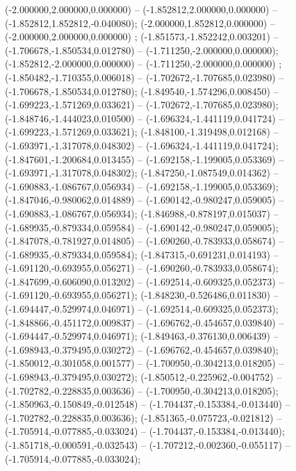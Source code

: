  (-2.000000,2.000000,0.000000) -- (-1.852812,2.000000,0.000000) -- (-1.852812,1.852812,-0.040080);
 (-2.000000,1.852812,0.000000) -- (-2.000000,2.000000,0.000000) ;
 (-1.851573,-1.852242,0.003201) -- (-1.706678,-1.850534,0.012780) -- (-1.711250,-2.000000,0.000000);
 (-1.852812,-2.000000,0.000000) -- (-1.711250,-2.000000,0.000000) ;
 (-1.850482,-1.710355,0.006018) -- (-1.702672,-1.707685,0.023980) -- (-1.706678,-1.850534,0.012780);
 (-1.849540,-1.574296,0.008450) -- (-1.699223,-1.571269,0.033621) -- (-1.702672,-1.707685,0.023980);
 (-1.848746,-1.444023,0.010500) -- (-1.696324,-1.441119,0.041724) -- (-1.699223,-1.571269,0.033621);
 (-1.848100,-1.319498,0.012168) -- (-1.693971,-1.317078,0.048302) -- (-1.696324,-1.441119,0.041724);
 (-1.847601,-1.200684,0.013455) -- (-1.692158,-1.199005,0.053369) -- (-1.693971,-1.317078,0.048302);
 (-1.847250,-1.087549,0.014362) -- (-1.690883,-1.086767,0.056934) -- (-1.692158,-1.199005,0.053369);
 (-1.847046,-0.980062,0.014889) -- (-1.690142,-0.980247,0.059005) -- (-1.690883,-1.086767,0.056934);
 (-1.846988,-0.878197,0.015037) -- (-1.689935,-0.879334,0.059584) -- (-1.690142,-0.980247,0.059005);
 (-1.847078,-0.781927,0.014805) -- (-1.690260,-0.783933,0.058674) -- (-1.689935,-0.879334,0.059584);
 (-1.847315,-0.691231,0.014193) -- (-1.691120,-0.693955,0.056271) -- (-1.690260,-0.783933,0.058674);
 (-1.847699,-0.606090,0.013202) -- (-1.692514,-0.609325,0.052373) -- (-1.691120,-0.693955,0.056271);
 (-1.848230,-0.526486,0.011830) -- (-1.694447,-0.529974,0.046971) -- (-1.692514,-0.609325,0.052373);
 (-1.848866,-0.451172,0.009837) -- (-1.696762,-0.454657,0.039840) -- (-1.694447,-0.529974,0.046971);
 (-1.849463,-0.376130,0.006439) -- (-1.698943,-0.379495,0.030272) -- (-1.696762,-0.454657,0.039840);
 (-1.850012,-0.301058,0.001577) -- (-1.700950,-0.304213,0.018205) -- (-1.698943,-0.379495,0.030272);
 (-1.850512,-0.225962,-0.004752) -- (-1.702782,-0.228835,0.003636) -- (-1.700950,-0.304213,0.018205);
 (-1.850963,-0.150849,-0.012548) -- (-1.704437,-0.153384,-0.013440) -- (-1.702782,-0.228835,0.003636);
 (-1.851365,-0.075723,-0.021812) -- (-1.705914,-0.077885,-0.033024) -- (-1.704437,-0.153384,-0.013440);
 (-1.851718,-0.000591,-0.032543) -- (-1.707212,-0.002360,-0.055117) -- (-1.705914,-0.077885,-0.033024);
